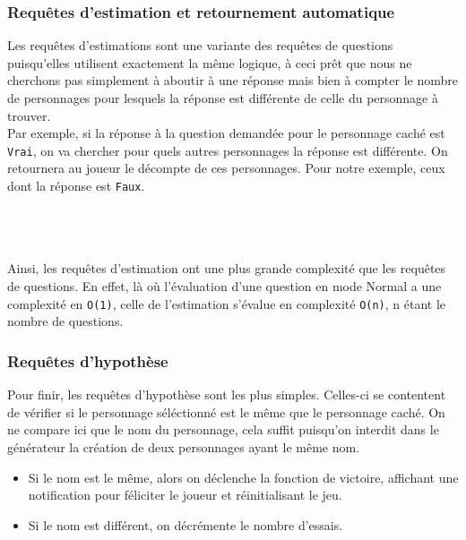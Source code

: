 \documentclass{article}
\begin{document}
		        \pagebreak
		        \subsubsection{Requêtes d'estimation et retournement automatique}
		            \par Les requêtes d'estimations sont une variante des requêtes de questions puisqu'elles utilisent exactement la même logique, à ceci prêt que nous ne cherchons pas simplement à aboutir à une réponse mais bien à compter le nombre de personnages pour lesquels la réponse est différente de celle du personnage à trouver.\\
		            Par exemple, si la réponse à la question demandée pour le personnage caché est \texttt{Vrai}, on va chercher pour quels autres personnages la réponse est différente. On retournera au joueur le décompte de ces personnages. Pour notre exemple, ceux dont la réponse est \texttt{Faux}.\\\\
            		\\\\
		            \par
                		Ainsi, les requêtes d'estimation ont une plus grande complexité que les requêtes de questions. En effet, là où l'évaluation d'une question en mode \textsf{Normal} a une complexité en \texttt{O(1)}, celle de l'estimation s'évalue en complexité \texttt{O(n)}, n étant le nombre de questions.
		
		        \subsubsection{Requêtes d'hypothèse}
		            Pour finir, les requêtes d'hypothèse sont les plus simples. Celles-ci se contentent de vérifier si le personnage séléctionné est le même que le personnage caché. On ne compare ici que le nom du personnage, cela suffit puisqu'on interdit dans le générateur la création de deux personnages ayant le même nom.\\
            		\begin{itemize}
            		    \item Si le nom est le même, alors on déclenche la fonction de victoire, affichant une notification pour féliciter le joueur et réinitialisant le jeu.
            		    \item Si le nom est différent, on décrémente le nombre d'essais.
            		\end{itemize}
    \pagebreak
    
\end{document}
